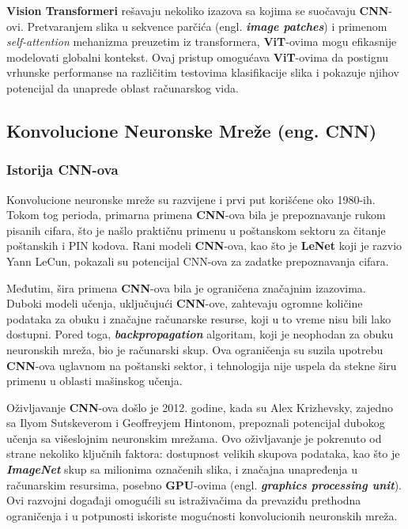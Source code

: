 \documentclass[12pt]{article}
\begin{document}
   \textbf{Vision Transformeri} rešavaju nekoliko izazova sa kojima se suočavaju \textbf{CNN}-ovi. 
   Pretvaranjem slika u sekvence parčića (engl. \textbf{\textit{image patches}}) i primenom \textit{self-attention} mehanizma preuzetim iz transformera, 
   \textbf{ViT}-ovima mogu efikasnije modelovati globalni kontekst. 
   Ovaj pristup omogućava \textbf{ViT}-ovima da postignu vrhunske performanse na različitim  
   testovima klasifikacije slika i pokazuje njihov potencijal da unaprede oblast računarskog vida.

   \subsection{Konvolucione Neuronske Mreže (eng. \textbf{CNN})}
   \subsubsection{Istorija \textbf{CNN}-ova}
   Konvolucione neuronske mreže su razvijene 
   i prvi put korišćene oko 1980-ih. Tokom tog perioda, primarna primena 
   \textbf{CNN}-ova bila je prepoznavanje rukom pisanih cifara, što je našlo 
   praktičnu primenu u poštanskom sektoru za čitanje poštanskih i PIN kodova. 
   Rani modeli \textbf{CNN}-ova, kao što je \textbf{LeNet} \cite{lenet} koji je razvio Yann LeCun, pokazali su 
   potencijal CNN-ova za zadatke prepoznavanja cifara.

   Međutim, šira primena \textbf{CNN}-ova bila je ograničena značajnim izazovima. 
   Duboki modeli učenja, uključujući \textbf{CNN}-ove, zahtevaju ogromne količine 
   podataka za obuku i značajne računarske resurse, koji u to vreme nisu 
   bili lako dostupni. Pored toga, \textbf{\textit{backpropagation}} algoritam, 
   koji je neophodan za obuku neuronskih mreža, bio je računarski skup. 
   Ova ograničenja su suzila upotrebu \textbf{CNN}-ova uglavnom na poštanski sektor, 
   i tehnologija nije uspela da stekne širu primenu u oblasti mašinskog učenja.

   Oživljavanje \textbf{CNN}-ova došlo je 2012. godine, kada su Alex Krizhevsky, zajedno 
   sa Ilyom Sutskeverom i Geoffreyjem Hintonom, prepoznali potencijal dubokog 
   učenja sa višeslojnim neuronskim mrežama. Ovo oživljavanje je pokrenuto od strane nekoliko 
   ključnih faktora: dostupnost velikih skupova podataka, kao što je \textbf{\textit{ImageNet}} \cite{imagenet} skup sa 
   milionima označenih slika, i značajna unapređenja u računarskim resursima, posebno \textbf{GPU}-ovima 
   (engl. \textbf{\textit{graphics processing unit}}). Ovi razvojni događaji omogućili su istraživačima da prevaziđu prethodna ograničenja i u 
   potpunosti iskoriste mogućnosti konvolucionih neuronskih mreža.
\end{document}
